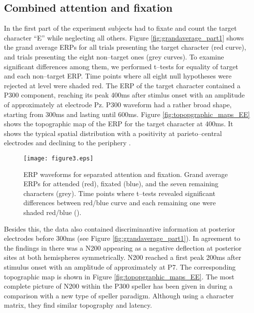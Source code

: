 \documentclass[a4paper,twocolumn]{article}
\begin{document}
\subsection*{Combined attention and fixation}
In the first part of the experiment subjects had to fixate and count the target character ``E'' while neglecting all others. Figure \ref{fig:grandaverage_part1} shows the grand average ERPs for all trials presenting the target character (red curve), and trials presenting the eight non--target ones (grey curves). To examine significant differences among them, we performed t--tests for equality of target and each non--target ERP. Time points where all eight null hypotheses were rejected at  level were shaded red. 
The ERP of the target character contained a P300 component, reaching its peak 400ms after stimlus onset with an amplitude of approximately  at electrode Pz. P300 waveform had a rather broad shape, starting from 300ms and lasting until 600ms. Figure \ref{fig:topopgraphic_maps_EE} shows the topographic map of the ERP for the target character at 400ms. It shows the typical spatial distribution with a positivity at parieto--central electrodes and declining to the periphery \cite{Sutton1965,Farwell1988}.  
\begin{figure*}[t!!]
\begin{center}
\texttt{[image: figure3.eps]}
\end{center}
\caption{{ERP waveforms for separated attention and fixation.} Grand average ERPs for attended (red), fixated (blue), and the seven remaining characters (grey). Time points where t--tests revealed significant differences between red/blue curve and each remaining one were shaded red/blue (). }
\label{fig:grandaverage_part2}
\end{figure*}
Besides this, the data also contained discriminantive information at posterior electrodes before 300ms (see Figure \ref{fig:grandaverage_part1}). In agreement to the findings in \cite{Krusienski2008,Hoffmann2008,Hong2009} there was a N200 appearing as a negative deflection at posterior sites at both hemispheres symmetrically. N200 reached a first peak 200ms after stimulus onset with an amplitude of approximately  at P7. The corresponding topographic map is shown in Figure \ref{fig:topopgraphic_maps_EE}. The most complete picture of N200 within the P300 speller has been given in \cite{Hong2009} during a comparison with a new type of speller paradigm.  Although using a  character matrix, they find similar topography and latency.
\end{document}
